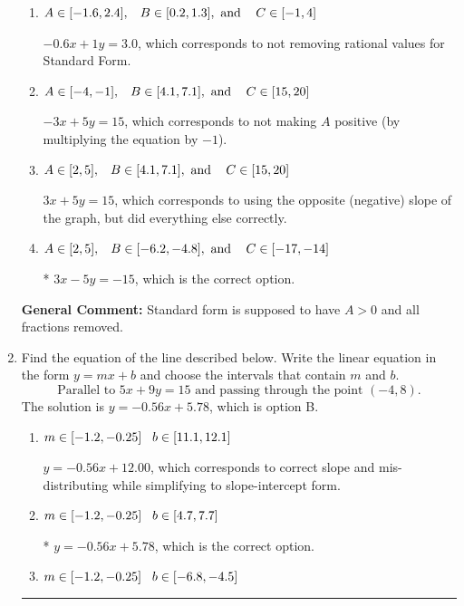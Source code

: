 \documentclass{extbook}[14pt]
\newcommand{\litem}[1]{\item #1

\rule{\textwidth}{0.4pt}}
\begin{document}
\begin{enumerate}
{\begin{enumerate}[label=\Alph*.]
 $-0.6x - 1y = -3.0$, which corresponds to using the opposite (negative) slope of the graph and not removing rational values.
\item \( A \in [-1.6, 2.4], \hspace{3mm} B \in [0.2, 1.3], \text{ and } \hspace{3mm} C \in [-1, 4] \)

 $-0.6x + 1y = 3.0$, which corresponds to not removing rational values for Standard Form.
\item \( A \in [-4, -1], \hspace{3mm} B \in [4.1, 7.1], \text{ and } \hspace{3mm} C \in [15, 20] \)

 $-3x + 5y = 15$, which corresponds to not making $A$ positive (by multiplying the equation by $-1$).
\item \( A \in [2, 5], \hspace{3mm} B \in [4.1, 7.1], \text{ and } \hspace{3mm} C \in [15, 20] \)

 $3x + 5y = 15$, which corresponds to using the opposite (negative) slope of the graph, but did everything else correctly.
\item \( A \in [2, 5], \hspace{3mm} B \in [-6.2, -4.8], \text{ and } \hspace{3mm} C \in [-17, -14] \)

* $3x - 5y = -15$, which is the correct option.
\end{enumerate}

\textbf{General Comment:} Standard form is supposed to have $A > 0$ and all fractions removed.
}
\litem{
Find the equation of the line described below. Write the linear equation in the form $ y=mx+b $ and choose the intervals that contain $m$ and $b$.
\[ \text{Parallel to } 5 x + 9 y = 15 \text{ and passing through the point } (-4, 8). \]The solution is \( y = -0.56x + 5.78 \), which is option B.\begin{enumerate}[label=\Alph*.]
\item \( m \in [-1.2, -0.25] \hspace*{3mm} b \in [11.1, 12.1] \)

 $y = -0.56x + 12.00$, which corresponds to correct slope and mis-distributing while simplifying to slope-intercept form.
\item \( m \in [-1.2, -0.25] \hspace*{3mm} b \in [4.7, 7.7] \)

* $y = -0.56x + 5.78$, which is the correct option.
\item \( m \in [-1.2, -0.25] \hspace*{3mm} b \in [-6.8, -4.5] \)


\end{enumerate}}
\end{enumerate}
\end{document}
